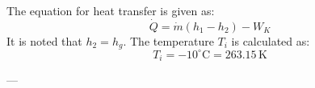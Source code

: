 The equation for heat transfer is given as:  
\[
\dot{Q} = \dot{m} \left( h_1 - h_2 \right) - W_K
\]  
It is noted that \( h_2 = h_g \).  
The temperature \( T_i \) is calculated as:  
\[
T_i = -10^\circ\text{C} = 263.15 \, \text{K}
\]  

---
